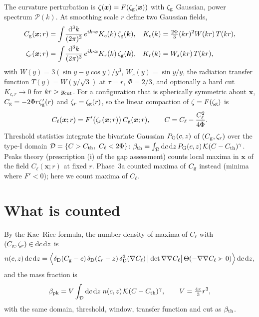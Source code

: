\documentclass[11pt]{article}
\newcommand{\Cg}{C_{\rm g}}
\newcommand{\Cl}{C_{\ell}}
\newcommand{\zr}{\zeta_r}
\newcommand{\zg}{\zeta_{\rm g}}
\newcommand{\dd}{\mathrm{d}}
\begin{document}
The curvature perturbation is $\zeta(\bm x)=F(\zg(\bm x))$ with $\zg$ Gaussian, power
spectrum $\mathcal P(k)$. At smoothing scale $r$ define two Gaussian fields,
\begin{align}
\Cg(\bm x;r)&=\int\!\frac{\dd^3k}{(2\pi)^3}\,e^{i\bm k\cdot\bm x}K_c(k)\,\zg(\bm k), &
K_c(k)&=\tfrac{2\Phi}{3}(kr)^2W(kr)\,T(kr),\\
\zr(\bm x;r)&=\int\!\frac{\dd^3k}{(2\pi)^3}\,e^{i\bm k\cdot\bm x}K_r(k)\,\zg(\bm k), &
K_r(k)&=W_s(kr)\,T(kr),
\end{align}
with $W(y)=3(\sin y-y\cos y)/y^3$, $W_s(y)=\sin y/y$, the radiation transfer function
$T(y)=W(y/\sqrt3)$ at $\tau=r$, $\Phi=2/3$, and optionally a hard cut $K_{c,r}\to0$ for
$kr>y_{\rm cut}$. For a configuration that is spherically symmetric about $\bm x$,
$\Cg=-2\Phi r\zg'(r)$ and $\zr=\zg(r)$, so the linear compaction of $\zeta=F(\zg)$ is
\cite{Ferrante,Young}
\begin{equation}
\Cl(\bm x;r)=F'\big(\zr(\bm x;r)\big)\,\Cg(\bm x;r),\qquad
C=\Cl-\frac{\Cl^2}{4\Phi}.
\label{eq:Cl}
\end{equation}
Threshold statistics integrate the bivariate Gaussian $P_{\rm G}(c,z)$ of $(\Cg,\zr)$ over the
type-I domain $\mathcal D=\{C>C_{\rm th},\ \Cl<2\Phi\}$:
$\beta_{\rm th}=\int_{\mathcal D}\dd c\,\dd z\,P_{\rm G}(c,z)\,\mathcal K(C-C_{\rm th})^\gamma$.
Peaks theory (prescription (i) of the gap assessment) counts local maxima in $\bm x$ of the field
$\Cl(\bm x;r)$ at fixed $r$. Phase~3a counted maxima of $\Cg$ instead (minima where $F'<0$);
here we count maxima of $\Cl$.

\section{What is counted}

By the Kac--Rice formula, the number density of maxima of $\Cl$ with $(\Cg,\zr)\in\dd c\,\dd z$ is
\begin{equation}
n(c,z)\,\dd c\,\dd z=\Big\langle\delta_{\rm D}(\Cg-c)\,\delta_{\rm D}(\zr-z)\,
\delta^3_{\rm D}(\nabla\Cl)\,\big|\det\nabla\nabla\Cl\big|\,
\Theta(-\nabla\nabla\Cl\succ0)\Big\rangle\,\dd c\,\dd z ,
\label{eq:KR}
\end{equation}
and the mass fraction is
\begin{equation}
\beta_{\rm pk}=V\int_{\mathcal D}\dd c\,\dd z\;n(c,z)\,\mathcal K(C-C_{\rm th})^\gamma,
\qquad V=\tfrac{4\pi}{3}r^3 ,
\label{eq:beta}
\end{equation}
with the same domain, threshold, window, transfer function and cut as $\beta_{\rm th}$.
\end{document}
